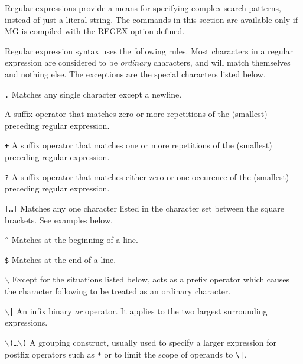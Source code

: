Regular expressions provide a means for specifying complex search
patterns, instead of just a literal string.  The commands in this
section are available only if MG is compiled with the REGEX option
defined. 

Regular expression syntax uses the following rules.  Most characters
in a regular expression are considered to be {\em ordinary\/} characters,
and will match themselves and nothing else.  The exceptions are the
special characters listed below.

\begin{define}{\hspace{1in}}

\item[{\tt .}\hfill] Matches any single character except a newline.  

\item[{\tt *}\hfill] A suffix operator that matches zero or more
repetitions of the (smallest) preceding regular expression. 

\item[{\tt +}\hfill] A suffix operator that matches one or more
repetitions of the (smallest) preceding regular expression. 

\item[{\tt ?}\hfill] A suffix operator that matches either zero or one
occurence of the (smallest) preceding regular expression. 

\item[{\tt [\ldots]}\hfill] Matches any one character listed in the
character set between the square brackets.  See examples below. 

\item[{\tt \^{ }}\hfill] Matches at the beginning of a line. 

\item[{\tt \$}\hfill] Matches at the end of a line. 

\item[{\tt $\backslash$}\hfill] Except for the situations listed
below, acts as a prefix operator which causes the character following
to be treated as an ordinary character. 

\item[{\tt $\backslash$|}\hfill] An infix binary {\em or\/} operator.
It applies to the two largest surrounding expressions. 

\item[{\tt $\backslash$(\ldots$\backslash$)}\hfill] A grouping construct,
usually used to specify a larger expression for postfix operators such
as \verb"*" or to limit the scope of operands to \verb"\|". 


\end{define}
